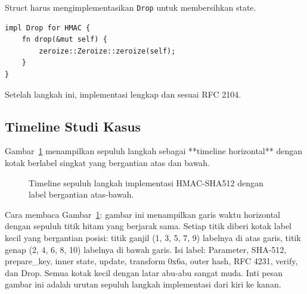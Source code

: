 \documentclass[11pt,a4paper]{article}
\begin{document}
Struct harus mengimplementasikan \texttt{Drop} untuk membersihkan state.

\begin{lstlisting}[style=code]
impl Drop for HMAC {
    fn drop(&mut self) {
        zeroize::Zeroize::zeroize(self);
    }
}
\end{lstlisting}

Setelah langkah ini, implementasi lengkap dan sesuai RFC 2104.

\subsection{Timeline Studi Kasus}

Gambar~\ref{fig:case-timeline} menampilkan sepuluh langkah sebagai **timeline horizontal** dengan kotak berlabel singkat yang bergantian atas dan bawah.

\begin{figure}[H]
	\centering
	\caption{Timeline sepuluh langkah implementasi HMAC-SHA512 dengan label bergantian atas-bawah.}
	\label{fig:case-timeline}
\end{figure}

Cara membaca Gambar~\ref{fig:case-timeline}: gambar ini menampilkan garis waktu horizontal dengan sepuluh titik hitam yang berjarak sama. Setiap titik diberi kotak label kecil yang bergantian posisi: titik ganjil (1, 3, 5, 7, 9) labelnya di atas garis, titik genap (2, 4, 6, 8, 10) labelnya di bawah garis. Isi label: Parameter, SHA-512, prepare\_key, inner state, update, transform 0x6a, outer hash, RFC 4231, verify, dan Drop. Semua kotak kecil dengan latar abu-abu sangat muda. Inti pesan gambar ini adalah urutan sepuluh langkah implementasi dari kiri ke kanan.
\end{document}
